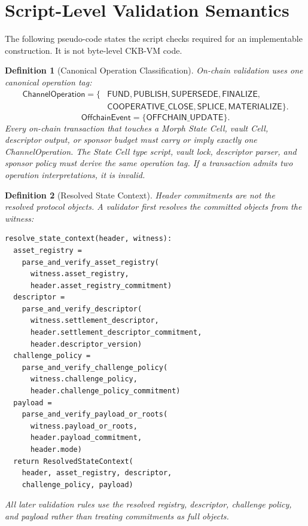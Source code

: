 \documentclass[a4paper,11pt]{article}
\newtheorem{definition}{Definition}
\begin{document}
\clearpage
\section{Script-Level Validation Semantics}

The following pseudo-code states the script checks required for an implementable construction. It is not byte-level CKB-VM code.

\begin{definition}[Canonical Operation Classification]
On-chain validation uses one canonical operation tag:
\[
\begin{aligned}
\mathsf{ChannelOperation}=\{&
\mathsf{FUND},\mathsf{PUBLISH},\mathsf{SUPERSEDE},
\mathsf{FINALIZE},\\
&\mathsf{COOPERATIVE\_CLOSE},\mathsf{SPLICE},
\mathsf{MATERIALIZE}\}.
\end{aligned}
\]
\[
\mathsf{OffchainEvent}=\{\mathsf{OFFCHAIN\_UPDATE}\}.
\]
Every on-chain transaction that touches a Morph State Cell, vault Cell,
descriptor output, or sponsor budget must carry or imply exactly one
\textsf{ChannelOperation}. The State Cell type script, vault lock, descriptor
parser, and sponsor policy must derive the same operation tag. If a transaction
admits two operation interpretations, it is invalid.
\end{definition}

\begin{definition}[Resolved State Context]
Header commitments are not the resolved protocol objects. A validator first
resolves the committed objects from the witness:
\begin{lstlisting}
resolve_state_context(header, witness):
  asset_registry =
    parse_and_verify_asset_registry(
      witness.asset_registry,
      header.asset_registry_commitment)
  descriptor =
    parse_and_verify_descriptor(
      witness.settlement_descriptor,
      header.settlement_descriptor_commitment,
      header.descriptor_version)
  challenge_policy =
    parse_and_verify_challenge_policy(
      witness.challenge_policy,
      header.challenge_policy_commitment)
  payload =
    parse_and_verify_payload_or_roots(
      witness.payload_or_roots,
      header.payload_commitment,
      header.mode)
  return ResolvedStateContext(
    header, asset_registry, descriptor,
    challenge_policy, payload)
\end{lstlisting}
All later validation rules use the resolved registry, descriptor, challenge
policy, and payload rather than treating commitments as full objects.
\end{definition}
\end{document}
